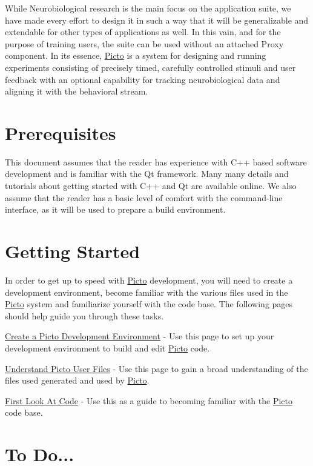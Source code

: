 While Neurobiological research is the main focus on the application suite, we have made every effort to design it in such a way that it will be generalizable and extendable for other types of applications as well. In this vain, and for the purpose of training users, the suite can be used without an attached Proxy component. In its essence, \hyperlink{namespace_picto}{Picto} is a system for designing and running experiments consisting of precisely timed, carefully controlled stimuli and user feedback with an optional capability for tracking neurobiological data and aligning it with the behavioral stream.\hypertarget{index_devdocs_getting_started_prerequisites}{}\section{Prerequisites}\label{index_devdocs_getting_started_prerequisites}
This document assumes that the reader has experience with C++ based software development and is familiar with the Qt framework. Many many details and tutorials about getting started with C++ and Qt are available online. We also assume that the reader has a basic level of comfort with the command-\/line interface, as it will be used to prepare a build environment.\hypertarget{index_devdocs_getting_started}{}\section{Getting Started}\label{index_devdocs_getting_started}
In order to get up to speed with \hyperlink{namespace_picto}{Picto} development, you will need to create a development environment, become familiar with the various files used in the \hyperlink{namespace_picto}{Picto} system and familiarize yourself with the code base. The following pages should help guide you through these tasks.
\begin{DoxyItemize}
\item \hyperlink{build_environment_preparation}{Create a Picto Development Environment} -\/ Use this page to set up your development environment to build and edit \hyperlink{namespace_picto}{Picto} code.
\item \hyperlink{user_files}{Understand Picto User Files} -\/ Use this page to gain a broad understanding of the files used generated and used by \hyperlink{namespace_picto}{Picto}.
\item \hyperlink{first_code_look}{First Look At Code} -\/ Use this as a guide to becoming familiar with the \hyperlink{namespace_picto}{Picto} code base.
\end{DoxyItemize}\hypertarget{index_to_do}{}\section{To Do...}\label{index_to_do}

